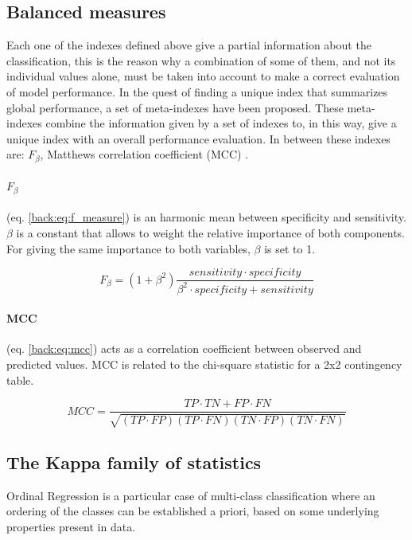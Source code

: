 \subsection{Balanced measures}

Each one of the indexes defined above give a partial information about the classification, this is the reason why a combination of some of them, and not its individual values alone, must be taken into account to make a correct evaluation of model performance. In the quest of finding a unique index that summarizes global performance, a set of meta-indexes have been proposed. These meta-indexes combine the information given by a set of indexes to, in this way, give a unique index with an overall performance evaluation. In between these indexes are: $F_\beta$, Matthews correlation coefficient (MCC) \citep{sammut2011encyclopedia}.

\paragraph{$F_\beta$} (eq. \ref{back:eq:f_measure}) is an harmonic mean between specificity and sensitivity. $\beta$ is a constant that allows to weight the relative importance of both components. For giving the same importance to both variables, $\beta$ is set to 1. 

\begin{equation}
F_\beta = (1 + \beta^2) \frac{sensitivity \cdot specificity}{\beta^2 \cdot specificity + sensitivity}
\label{back:eq:f_measure}
\end{equation}

\paragraph{MCC} (eq. \ref{back:eq:mcc}) acts as a correlation coefficient between observed and predicted values. MCC is related to the chi-square statistic for a 2x2 contingency table. 

\begin{equation}
MCC = \frac{TP \cdot TN + FP \cdot FN}{\sqrt{(TP \cdot FP)(TP \cdot FN) (TN \cdot FP)(TN \cdot FN)}}
\label{back:eq:mcc}
\end{equation}


\subsection{The Kappa family of statistics}

Ordinal Regression is a particular case of multi-class classification where an ordering of the classes can be established a priori, based on some underlying properties present in data.

